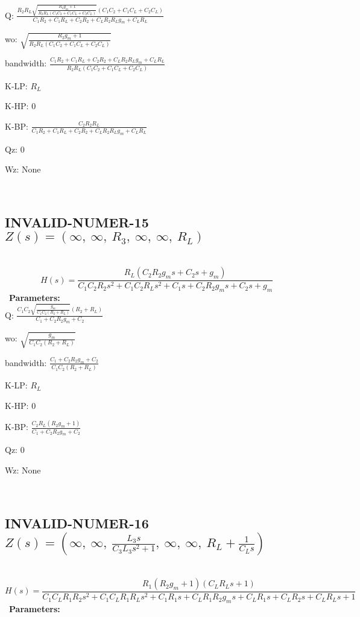 \documentclass{article}
\begin{document}
Q: $\frac{R_{2} R_{L} \sqrt{\frac{R_{2} g_{m} + 1}{R_{2} R_{L} \left(C_{1} C_{2} + C_{1} C_{L} + C_{2} C_{L}\right)}} \left(C_{1} C_{2} + C_{1} C_{L} + C_{2} C_{L}\right)}{C_{1} R_{2} + C_{1} R_{L} + C_{2} R_{2} + C_{L} R_{2} R_{L} g_{m} + C_{L} R_{L}}$\ 

wo: $\sqrt{\frac{R_{2} g_{m} + 1}{R_{2} R_{L} \left(C_{1} C_{2} + C_{1} C_{L} + C_{2} C_{L}\right)}}$\ 

bandwidth: $\frac{C_{1} R_{2} + C_{1} R_{L} + C_{2} R_{2} + C_{L} R_{2} R_{L} g_{m} + C_{L} R_{L}}{R_{2} R_{L} \left(C_{1} C_{2} + C_{1} C_{L} + C_{2} C_{L}\right)}$\ 

K-LP: $R_{L}$\ 

K-HP: $0$\ 

K-BP: $\frac{C_{2} R_{2} R_{L}}{C_{1} R_{2} + C_{1} R_{L} + C_{2} R_{2} + C_{L} R_{2} R_{L} g_{m} + C_{L} R_{L}}$\ 

Qz: $0$\ 

Wz: $\text{None}$\ 

\ 

\subsection{INVALID-NUMER-15 $Z(s) = \left( \infty, \  \infty, \  R_{3}, \  \infty, \  \infty, \  R_{L}\right)$ } \ 
\textbf{\[H(s) = \frac{R_{L} \left(C_{2} R_{2} g_{m} s + C_{2} s + g_{m}\right)}{C_{1} C_{2} R_{2} s^{2} + C_{1} C_{2} R_{L} s^{2} + C_{1} s + C_{2} R_{2} g_{m} s + C_{2} s + g_{m}}\] } \ 
\textbf{Parameters:}\\ 

Q: $\frac{C_{1} C_{2} \sqrt{\frac{g_{m}}{C_{1} C_{2} \left(R_{2} + R_{L}\right)}} \left(R_{2} + R_{L}\right)}{C_{1} + C_{2} R_{2} g_{m} + C_{2}}$\ 

wo: $\sqrt{\frac{g_{m}}{C_{1} C_{2} \left(R_{2} + R_{L}\right)}}$\ 

bandwidth: $\frac{C_{1} + C_{2} R_{2} g_{m} + C_{2}}{C_{1} C_{2} \left(R_{2} + R_{L}\right)}$\ 

K-LP: $R_{L}$\ 

K-HP: $0$\ 

K-BP: $\frac{C_{2} R_{L} \left(R_{2} g_{m} + 1\right)}{C_{1} + C_{2} R_{2} g_{m} + C_{2}}$\ 

Qz: $0$\ 

Wz: $\text{None}$\ 

\ 

\subsection{INVALID-NUMER-16 $Z(s) = \left( \infty, \  \infty, \  \frac{L_{3} s}{C_{3} L_{3} s^{2} + 1}, \  \infty, \  \infty, \  R_{L} + \frac{1}{C_{L} s}\right)$ } \ 
\textbf{\[H(s) = \frac{R_{1} \left(R_{2} g_{m} + 1\right) \left(C_{L} R_{L} s + 1\right)}{C_{1} C_{L} R_{1} R_{2} s^{2} + C_{1} C_{L} R_{1} R_{L} s^{2} + C_{1} R_{1} s + C_{L} R_{1} R_{2} g_{m} s + C_{L} R_{1} s + C_{L} R_{2} s + C_{L} R_{L} s + 1}\] } \ 
\textbf{Parameters:}\\ 
\end{document}
